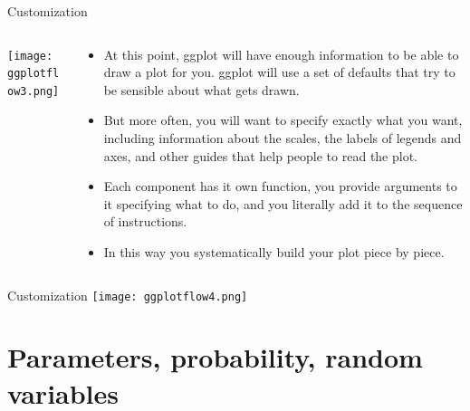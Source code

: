 \documentclass[10pt,handout]{beamer}\usepackage[]{graphicx}\usepackage[]{color}
\begin{document}
\begin{frame}{Customization}
	\begin{columns}
		\begin{column}{0.5\textwidth}  %
			\begin{center}
				\texttt{[image: ggplotflow3.png]}
			\end{center}
		\end{column}
		\begin{column}{0.5\textwidth}
			\begin{itemize}
				\item At this point, ggplot will have enough information to be able to draw
				a plot for you. ggplot will use a set of defaults that try to be sensible about what gets drawn. 
				\item But more often, you will want to specify exactly what you want, including
				information about the scales, the labels of legends and axes, and
				other guides that help people to read the plot. 
				\item Each component has it own function, you provide arguments to it
				specifying what to do, and you literally add it to the sequence of
				instructions. 
				\item In this way you systematically build your plot piece by
				piece.
			\end{itemize}
		\end{column}
	\end{columns}
\end{frame}



\begin{frame}{Customization}
	\centering
	\texttt{[image: ggplotflow4.png]}
\end{frame}



\section{Parameters, probability, random variables}
\end{document}

